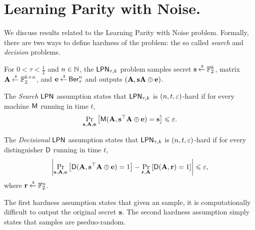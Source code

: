 \section{Learning Parity with Noise.}
We discuss results related to the Learning Parity with Noise problem.
Formally, there are two ways to define hardness of the \LPN problem: the so called {\em search} and {\em decision} \LPN problems.

\begin{definition}
	For $0 < \tau < \frac{1}{2}$ and $n \in {\mathbb N}$, the $\mathsf{LPN}_{\tau, k}$ problem samples secret ${\mathbf s} \mathbin{\stackrel{\mbox{\,\tiny \$}}{\gets}} {\mathbb F}_2^k$, matrix ${\mathbf A} \mathbin{\stackrel{\mbox{\,\tiny \$}}{\gets}} {\mathbb F}_2^{k \times n}$, and ${\mathbf e} \mathbin{\stackrel{\mbox{\,\tiny \$}}{\gets}} \mathsf{Ber}_\tau^{n}$ and outputs $({\mathbf A}, {\mathbf s}{\mathbf A}\oplus {\mathbf e})$.
	
	The {\em Search} $\mathsf{LPN}$ assumption states that $\mathsf{LPN}_{\tau, k}$ is $(n, t, \varepsilon)$-hard if for every machine $\mathsf{M}$ running in time $t$,
	\begin{align*}
		\underset{{\mathbf s},{\mathbf A},{\mathbf e}}{\Pr}\left[\mathsf{M}({\mathbf A},{\mathbf s}^\top{\mathbf A}\oplus{\mathbf e})={\mathbf s}\right] \leqslant \varepsilon.
	\end{align*}
	
	The {\em Decisional} $\mathsf{LPN}$ assumption states that $\mathsf{LPN}_{\tau, k}$ is $(n, t, \varepsilon)$-hard if for every distinguisher $\mathsf{D}$ running in time $t$,
	\begin{align*}
		\abs{\underset{\bs,\bA,\be}{\Pr}\left[\pred{D}(\bA,\bs^\top\bA\oplus\be)=1\right] - \underset{\br, \bA}{\Pr}\left[\pred{D}(\bA,\br)=1\right] }\leq \eps,
	\end{align*}
	where ${\mathbf r} \mathbin{\stackrel{\mbox{\,\tiny \$}}{\gets}} {\mathbb F}_2^n$.
\end{definition}
The first hardness assumption states that given an \LPN sample, it is computationally difficult to output the original secret ${\mathbf s}$.
The second hardness assumption simply states that \LPN samples are pseduo-random.

